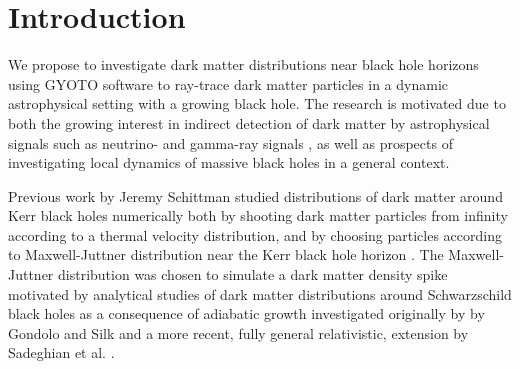 \documentclass[12pt]{article}
\title{}
\author{}
\begin{document}
\maketitle


\begin{abstract}

\end{abstract}

\newpage

\tableofcontents

\newpage

\section{Introduction}



We propose to investigate dark matter distributions near black hole horizons using GYOTO software to ray-trace dark matter 
particles in a dynamic astrophysical setting with a 
growing black hole. The 
research is motivated due to both the growing interest in indirect 
detection of dark matter by astrophysical signals such as 
neutrino- and gamma-ray signals 
\citep{2015_Arina_Silk}  %
, as well as prospects of investigating 
local dynamics of %
massive black holes in a general 
context. 

Previous work by Jeremy Schittman studied distributions of dark matter 
around Kerr black holes numerically both by shooting dark matter particles 
from infinity according to a thermal velocity distribution, and by 
choosing particles according to Maxwell-Juttner distribution near the 
Kerr black hole horizon \citep{schnittman2015}.
The Maxwell-Juttner distribution was 
chosen to simulate a dark matter density spike motivated by analytical 
studies of dark matter distributions around Schwarzschild black holes 
as a consequence of adiabatic growth investigated originally by 
by Gondolo and Silk \citep{GS_1999} 
and a more recent, fully general relativistic, extension by Sadeghian et al. 
\citep{Sadeghian_Ferrer_Will_2013}.
\end{document}
